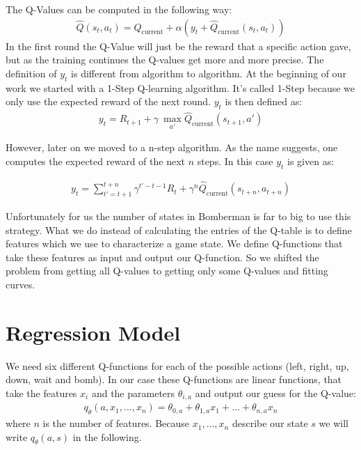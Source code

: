 The Q-Values can be computed in the following way:
\begin{align}
    \hat{Q}(s_t, a_t) = \hat{Q}_{\text{current}} + \alpha (y_t + \hat{Q}_{\text{current}} (s_t, a_t))
\end{align}
In the first round the Q-Value will just be the reward that a specific action gave, but as the training continues the Q-values get more and more precise.
The definition of $y_t$ is different from algorithm to algorithm.
At the beginning of our work we started with a 1-Step Q-learning algorithm.
It's called 1-Step because we only use the expected reward of the next round.
$y_t$ is then defined as:
\begin{align}
y_t = R_{t+1} + \gamma \ \underset{a'}{\max}  \hat{Q}_{\text{current}}(s_{t+1}, a')
\end{align}

However, later on we moved to a n-step algorithm. 
As the name suggests, one computes the expected reward of the next $n$ steps.
In this case $y_t$ is given as:

\begin{align}
    y_t = \sum_{t'=t+1}^{t+n} \gamma^{t' - t -1} R_t + \gamma^n \hat{Q}_{\text{current}} (s_{t+n}, a_{t+n})
\end{align}


Unfortunately for us the number of states in Bomberman is far to big to use this strategy.
What we do instead of calculating the entries of the Q-table is to define features which we use to characterize a game state.
We define Q-functions that take these features as input and output our Q-function.
So we shifted the problem from getting all Q-values to getting only some Q-values and fitting curves.

\section{Regression Model}

We need six different Q-functions for each of the possible actions (left, right, up, down, wait and bomb).
In our case these Q-functions are linear functions, that take the features $x_i$ and the parameters $\theta_{i, a}$ and output our guess for the Q-value:
\begin{align}
    q_\theta (a, x_1, \dots , x_n) = \theta_{0,a} + \theta_{1,a} x_1 + \dots + \theta_{n,a} x_n
\end{align}
where $n$ is the number of features. 
Because $x_1, \dots, x_n $ describe our state $s$ we will write $q_\theta (a, s)$ in the following.\\

